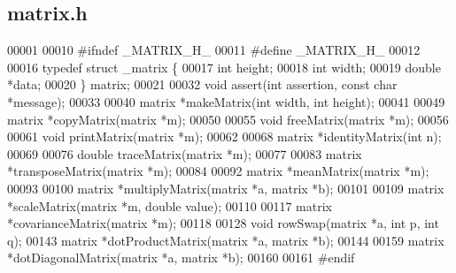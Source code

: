 \subsection{matrix.\+h}
\label{matrix_8h_source}

\begin{DoxyCode}
00001 
00010 \textcolor{preprocessor}{#ifndef \_MATRIX\_H\_}
00011 \textcolor{preprocessor}{#define \_MATRIX\_H\_}
00012 
00016 \textcolor{keyword}{typedef} \textcolor{keyword}{struct }_matrix \{
00017   \textcolor{keywordtype}{int} height;
00018   \textcolor{keywordtype}{int} width;
00019   \textcolor{keywordtype}{double} *data;
00020 \} matrix;
00021 
00032 \textcolor{keywordtype}{void} assert(\textcolor{keywordtype}{int} assertion, \textcolor{keyword}{const} \textcolor{keywordtype}{char} *message);
00033 
00040 matrix *makeMatrix(\textcolor{keywordtype}{int} width, \textcolor{keywordtype}{int} height);
00041 
00049 matrix *copyMatrix(matrix *m);
00050 
00055 \textcolor{keywordtype}{void} freeMatrix(matrix *m);
00056 
00061 \textcolor{keywordtype}{void} printMatrix(matrix *m);
00062 
00068 matrix *identityMatrix(\textcolor{keywordtype}{int} n);
00069 
00076 \textcolor{keywordtype}{double} traceMatrix(matrix *m);
00077 
00083 matrix *transposeMatrix(matrix *m);
00084 
00092 matrix *meanMatrix(matrix *m);
00093 
00100 matrix *multiplyMatrix(matrix *a, matrix *b);
00101 
00109 matrix *scaleMatrix(matrix *m, \textcolor{keywordtype}{double} value);
00110 
00117 matrix *covarianceMatrix(matrix *m);
00118 
00128 \textcolor{keywordtype}{void} rowSwap(matrix *a, \textcolor{keywordtype}{int} p, \textcolor{keywordtype}{int} q);
00143 matrix *dotProductMatrix(matrix *a, matrix *b);
00144 
00159 matrix *dotDiagonalMatrix(matrix *a, matrix *b);
00160 
00161 \textcolor{preprocessor}{#endif}
\end{DoxyCode}
